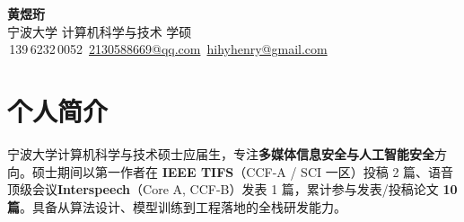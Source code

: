 \documentclass[a4paper,10pt]{article}
\newcommand{\contactitem}[2]{\raisebox{-0.15ex}{#1}\,#2}
\begin{document}
\begin{center}
    {\Huge\bfseries\color{themecolor} 黄煜珩}\\[6pt]
    {\large\color{lightgray} 宁波大学\,\textbar\,计算机科学与技术\,\textbar\,学硕}\\[8pt]
    {\small\color{themecolor}
    \contactitem{\faPhone}{139\,6232\,0052} \quad
    \contactitem{\faEnvelope}{\href{mailto:2130588669@qq.com}{2130588669@qq.com}} \quad
    \contactitem{\faEnvelope}{\href{mailto:hihyhenry@gmail.com}{hihyhenry@gmail.com}}
    }
\end{center}

\section{个人简介}

\begin{minipage}[t]{\textwidth}
\vspace{2pt}
宁波大学计算机科学与技术硕士应届生，专注\textbf{多媒体信息安全与人工智能安全}方向。硕士期间以第一作者在 \textbf{IEEE TIFS}（CCF-A / SCI 一区）投稿 2 篇、语音顶级会议\textbf{Interspeech}（Core A, CCF-B）发表 1 篇，累计参与发表/投稿论文 \textbf{10 篇}。具备从算法设计、模型训练到工程落地的全栈研发能力。
\vspace{8pt}
\end{minipage}
\end{document}
